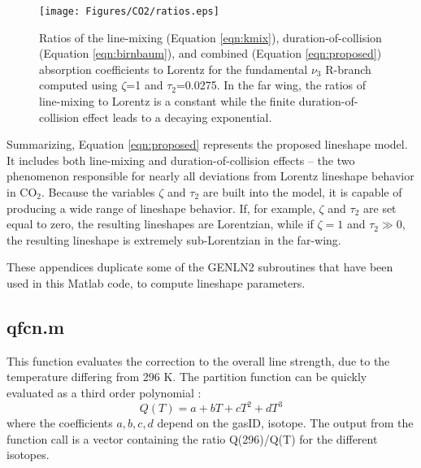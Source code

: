 \documentclass[11pt]{article}
\begin{document}
\begin{figure}[h]
\begin{center}\texttt{[image: Figures/CO2/ratios.eps]}
\end{center}
  \caption[Ratios of the line-mixing, duration-of-collision, and combined
   absorption coefficients to Lorentz for the fundamental $\nu_3$ R-branch] 
    {Ratios of the line-mixing (Equation \ref{eqn:kmix}),  
    duration-of-collision (Equation \ref{eqn:birnbaum}), and combined
    (Equation \ref{eqn:proposed}) absorption coefficients to Lorentz 
    for the fundamental $\nu_3$ R-branch computed using $\zeta$=1 
    and $\tau_2$=0.0275.  In the far wing, the ratios of line-mixing to
    Lorentz is a constant while the finite duration-of-collision effect 
    leads to a decaying exponential.} 
  \label{fig:ratios}
\end{figure}

Summarizing, Equation \ref{eqn:proposed} represents the proposed lineshape
model.  It includes both line-mixing and duration-of-collision effects -- 
the
two phenomenon responsible for nearly all deviations from Lorentz lineshape
behavior in CO$_2$.  Because the variables $\zeta$ and $\tau_2$ are built
into the model, it is capable of producing a wide range of lineshape
behavior.  If, for example, $\zeta$ and
$\tau_2$ are set equal to zero, the resulting lineshapes are Lorentzian, 
while if $\zeta=1$ and $\tau_2 \gg 0$, the resulting lineshape is extremely
sub-Lorentzian in the far-wing. 

\newpage
{}
These appendices duplicate some of the GENLN2 subroutines that have 
been used in this Matlab code, to compute lineshape parameters.

\subsection{qfcn.m}
This function evaluates the correction to the overall line strength, due 
to the temperature differing from 296 K. The partition function can be 
quickly evaluated as a third order polynomial :
\begin{displaymath}
Q(T)=a + bT + cT^{2} + dT^{3}
\end{displaymath} 
where the coefficients $a,b,c,d$ depend on the gasID, isotope. The output 
from the function call is a vector containing the ratio Q(296)/Q(T) for the
different isotopes.
\end{document}

